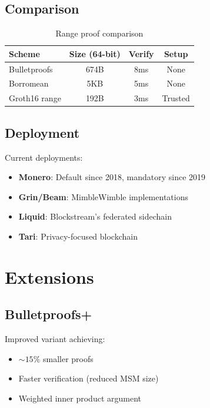 \documentclass[11pt,a4paper]{article}
\begin{document}
\subsection{Comparison}

\begin{table}[h]
\centering
\begin{tabular}{lccc}
\toprule
\textbf{Scheme} & \textbf{Size (64-bit)} & \textbf{Verify} & \textbf{Setup} \\
\midrule
Bulletproofs & 674B & 8ms & None \\
Borromean & 5KB & 5ms & None \\
Groth16 range & 192B & 3ms & Trusted \\
\bottomrule
\end{tabular}
\caption{Range proof comparison}
\label{tab:compare}
\end{table}

\subsection{Deployment}

Current deployments:
\begin{itemize}
    \item \textbf{Monero}: Default since 2018, mandatory since 2019
    \item \textbf{Grin/Beam}: MimbleWimble implementations
    \item \textbf{Liquid}: Blockstream's federated sidechain
    \item \textbf{Tari}: Privacy-focused blockchain
\end{itemize}

\section{Extensions}

\subsection{Bulletproofs+}

Improved variant \cite{bulletproofs+} achieving:
\begin{itemize}
    \item $\sim 15\%$ smaller proofs
    \item Faster verification (reduced MSM size)
    \item Weighted inner product argument
\end{itemize}
\end{document}
